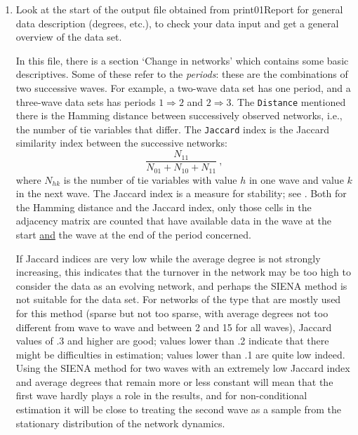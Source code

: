 \documentclass[a4paper,fleqn,11pt]{article}
\newcommand{\+}{\, + \,}
\newcommand{\sfn}[1]{\textsf{#1}}
\newcommand{\SI}{{\sf SIENA }}
\begin{document}
\begin{enumerate}
\item Look at the start of the output file obtained from
       \sfn{print01Report} for general data
      description (degrees, etc.), to check your data input
      and get a general overview of the data set.

      In this file, there is a section `Change in networks' which contains
      some basic descriptives. Some of these refer to the \emph{periods}:
      these are the combinations of two successive waves.
      For example, a two-wave data set has one period, and a
      three-wave data sets has periods $1 \Rightarrow 2$ and $2 \Rightarrow 3$.
      The \texttt{Distance} mentioned there
      is the Hamming distance between successively observed networks, i.e.,
      the number of tie variables that differ.
      The \texttt{Jaccard} index is the Jaccard similarity index between the
      successive networks:
      \[
         \frac{N_{11}}{N_{01}+N_{10}+N_{11}} \ ,
      \]
      where $N_{hk}$ is the number of tie variables with value $h$ in one
      wave and value $k$ in the next wave. The Jaccard index is a measure for
      stability; see \citet{SnijdersEA10b}.
      Both for the Hamming distance and the Jaccard index, only those cells
      in the adjacency matrix are counted that have available data in the wave
      at the start \underline{and} the wave at the end of the period concerned.

      If Jaccard indices are very low while the average
      degree is not strongly increasing, this indicates
      that the turnover in the network may be too high to consider
      the data as an evolving network, and perhaps the \SI method
      is not suitable for the data set.
      For networks of the type that are mostly used for this method
      (sparse but not too sparse,
      with average degrees not too different from wave to wave
      and between 2 and 15 for all waves),
      Jaccard values of .3 and higher
      are good; values lower than .2 indicate that there might be difficulties
      in estimation; values lower than .1 are quite low indeed.
      Using the \SI method for two waves with an extremely low Jaccard
      index and average degrees that remain more or less constant
      will mean that the first wave hardly plays a role in the results, and
      for non-conditional estimation it will be close to treating the second wave as
      a sample from the stationary distribution of the network dynamics.


\end{enumerate}
\end{document}
